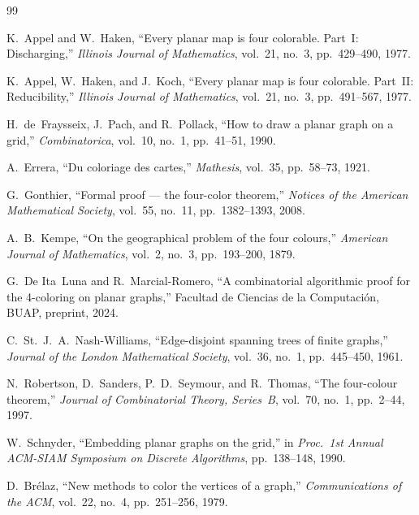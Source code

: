 \documentclass[11pt,twocolumn]{article}
\begin{document}
\begin{thebibliography}{99}

K.~Appel and W.~Haken,
``Every planar map is four colorable. Part~I: Discharging,''
\textit{Illinois Journal of Mathematics}, vol.~21, no.~3, pp.~429--490, 1977.

K.~Appel, W.~Haken, and J.~Koch,
``Every planar map is four colorable. Part~II: Reducibility,''
\textit{Illinois Journal of Mathematics}, vol.~21, no.~3, pp.~491--567, 1977.

H.~de~Fraysseix, J.~Pach, and R.~Pollack,
``How to draw a planar graph on a grid,''
\textit{Combinatorica}, vol.~10, no.~1, pp.~41--51, 1990.

A.~Errera,
``Du coloriage des cartes,''
\textit{Mathesis}, vol.~35, pp.~58--73, 1921.

G.~Gonthier,
``Formal proof --- the four-color theorem,''
\textit{Notices of the American Mathematical Society}, vol.~55, no.~11,
pp.~1382--1393, 2008.

A.~B.~Kempe,
``On the geographical problem of the four colours,''
\textit{American Journal of Mathematics}, vol.~2, no.~3, pp.~193--200, 1879.

G.~De Ita~Luna and R.~Marcial-Romero,
``A combinatorial algorithmic proof for the 4-coloring on planar graphs,''
Facultad de Ciencias de la Computaci\'on, BUAP, preprint, 2024.

C.~St.~J.~A.~Nash-Williams,
``Edge-disjoint spanning trees of finite graphs,''
\textit{Journal of the London Mathematical Society}, vol.~36, no.~1,
pp.~445--450, 1961.

N.~Robertson, D.~Sanders, P.~D.~Seymour, and R.~Thomas,
``The four-colour theorem,''
\textit{Journal of Combinatorial Theory, Series~B}, vol.~70, no.~1,
pp.~2--44, 1997.

W.~Schnyder,
``Embedding planar graphs on the grid,''
in \textit{Proc.\ 1st Annual ACM-SIAM Symposium on Discrete Algorithms},
pp.~138--148, 1990.

D.~Br\'elaz,
``New methods to color the vertices of a graph,''
\textit{Communications of the ACM}, vol.~22, no.~4, pp.~251--256, 1979.

\end{thebibliography}
\end{document}
